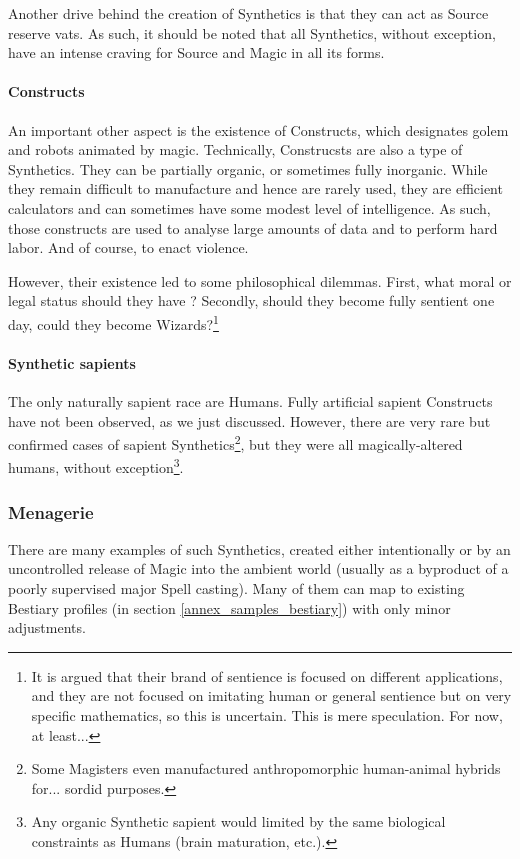 Another drive behind the creation of Synthetics is that they can act as Source reserve vats. As such, it should be noted that all Synthetics, without exception, have an intense craving for Source and Magic in all its forms.


\paragraph{Constructs}

An important other aspect is the existence of Constructs, which designates golem and robots animated by magic. Technically, Construcsts are also a type of Synthetics. They can be partially organic, or sometimes fully inorganic. While they remain difficult to manufacture and hence are rarely used, they are efficient calculators and can sometimes have some modest level of intelligence. As such, those constructs are used to analyse large amounts of data and to perform hard labor. And of course, to enact violence.

However, their existence led to some philosophical dilemmas. First, what moral or legal status should they have ? Secondly, should they become fully sentient one day, could they become Wizards?\footnote{It is argued that their brand of sentience is focused on different applications, and they are not focused on imitating human or general sentience but on very specific mathematics, so this is uncertain. This is mere speculation. For now, at least...} 


\paragraph{Synthetic sapients}

The only naturally sapient race are Humans. Fully artificial sapient Constructs have not been observed, as we just discussed. However, there are very rare but confirmed cases of sapient Synthetics\footnote{Some Magisters even manufactured anthropomorphic human-animal hybrids for... sordid purposes.}, but they were all magically-altered humans, without exception\footnote{Any organic Synthetic sapient would limited by the same biological constraints as Humans (brain maturation, etc.).}.


\subsubsection{Menagerie}


There are many examples of such Synthetics, created either intentionally or by an uncontrolled release of Magic into the ambient world (usually as a byproduct of a poorly supervised major Spell casting). Many of them can map to existing Bestiary profiles (in section \ref{annex_samples_bestiary}) with only minor adjustments.

